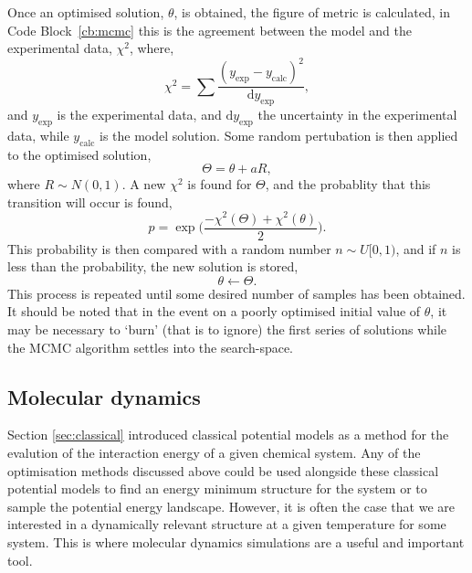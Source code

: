 Once an optimised solution, $\theta$, is obtained, the figure of metric is calculated, in Code Block~\ref{cb:mcmc} this is the agreement between the model and the experimental data, $\chi^2$, where,
%
\begin{equation}
\chi^2 = \sum\frac{(y_{\text{exp}} - y_{\text{calc}})^2}{\text{d}y_{\text{exp}}},
\end{equation}
%
and $y_{\text{exp}}$ is the experimental data, and $\text{d}y_{\text{exp}}$ the uncertainty in the experimental data, while $y_{\text{calc}}$ is the model solution.
Some random pertubation is then applied to the optimised solution,
%
\begin{equation}
\Theta = \theta + aR,
\end{equation}
%
where $R\sim N(0, 1)$.
A new $\chi^2$ is found for $\Theta$, and the probablity that this transition will occur is found,
%
\begin{equation}
p = \exp{\bigg(\frac{-\chi^2(\Theta) + \chi^2(\theta)}{2}\bigg)}.
\end{equation}
%
This probability is then compared with a random number $n\sim U[0, 1)$, and if $n$ is less than the probability, the new solution is stored,
%
\begin{equation}
\theta \leftarrow \Theta.
\end{equation}
%
This process is repeated until some desired number of samples has been obtained.
It should be noted that in the event on a poorly optimised initial value of $\theta$, it may be necessary to `burn' (that is to ignore) the first series of solutions while the MCMC algorithm settles into the search-space.

\subsection{Molecular dynamics}
\label{sec:md}
Section \ref{sec:classical} introduced classical potential models as a method for the evalution of the interaction energy of a given chemical system.
Any of the optimisation methods discussed above could be used alongside these classical potential models to find an energy minimum structure for the system or to sample the potential energy landscape.
However, it is often the case that we are interested in a dynamically relevant structure at a given temperature for some system.
This is where molecular dynamics simulations are a useful and important tool.

